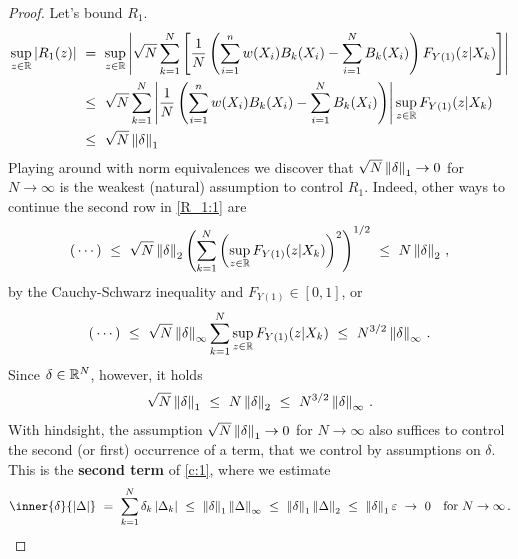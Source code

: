\begin{proof}
  Let's bound $R_1$.
  \begin{align}
    \label{R_1:1}
    \begin{split}
    \sup_{z\in\R}
    \left| 
    R_1(z)
    \right|
    &
    \ 
    =
    \ 
    \sup_{z\in\R}
    \left| 
  \sqrt{N}
  \sum_{k=1}^{N} 
  \left[ 
  \frac{1}{N}
  \left( 
    \sum_{i=1}^{n} 
    w(X_i)
    B_k(X_i)
    -
    \sum_{i=1}^{N} 
    B_k(X_i)
  \right)
  F_{Y(1)}(z|X_k)
  \right]
    \right|
    \\
    &
    \ 
    \le
    \ 
  \sqrt{N}
  \sum_{k=1}^{N} 
  \left| 
  \frac{1}{N}
  \left( 
    \sum_{i=1}^{n} 
    w(X_i)
    B_k(X_i)
    -
    \sum_{i=1}^{N} 
    B_k(X_i)
  \right)
  \right|
    \sup_{z\in\R}
  F_{Y(1)}(z|X_k)
  \\
    &
    \ 
    \le
    \ 
  \sqrt{N}
  \norm{\delta}_1
    \end{split}
  \end{align}
  Playing around with norm equivalences we discover that 
  $\sqrt{N}\left\lVert\delta\right\rVert_1\to 0$ for $N\to \infty$ is the weakest
  (natural) assumption to
  control $R_1$.
  Indeed, other ways to continue the second row in \eqref{R_1:1} are
  \begin{gather*}
    (\,\cdots)
    \ 
  \le
    \ 
  \sqrt{N}
  \norm{\delta}_2
  \left( 
  \sum_{k=1}^{N} 
  \left( 
    \sup_{z\in\R}
  F_{Y(1)}(z|X_k)
  \right)^2
\right)^{1/2}
\ 
\le
\ 
N
  \norm{\delta}_2\,,
  \end{gather*}
  by the Cauchy-Schwarz inequality and
  $
  F_{Y(1)}\in [0,1]
  $,
or
\begin{gather*}
  (\,\cdots)
  \ 
  \le
  \ 
  \sqrt{N}
  \norm{\delta}_\infty
  \sum_{k=1}^{N} 
    \sup_{z\in\R}
  F_{Y(1)}(z|X_k)
  \ 
  \le
  \ 
  N^{3/2}
  \norm{\delta}_\infty
  \,.
\end{gather*}
Since $\delta\in \mathbb{R}^N$, however, it holds
\begin{gather*}
  \sqrt{N}\norm{\delta}_1
  \ 
  \le
  \ 
  N\norm{\delta}_2
  \ 
  \le
  \ 
  N^{3/2}\norm{\delta}_\infty
  \,.
\end{gather*}
With hindsight, the assumption 
  $\sqrt{N}\left\lVert\delta\right\rVert_1\to 0$ for $N\to \infty$ 
  also 
  suffices 
  to control the second (or first) occurrence of a term, that we control by assumptions on $\delta$.
This is the \textbf{second term} of \eqref{c:1}, where we estimate
\begin{gather*}
  \inner{\delta}{\left| \Delta \right|}
  \ 
  =
  \ 
  \sum_{k=1}^{N} 
  \delta_k
  \left| \Delta_k \right|
  \ 
  \le
  \ 
  \norm{\delta}_1
  \norm{\Delta}_\infty
  \ 
  \le
  \ 
  \norm{\delta}_1
  \norm{\Delta}_2
  \ 
  \le
  \ 
  \norm{\delta}_1
  \varepsilon
  \ 
  \to
  \ 
  0
  \quad
  \text{for}\ 
  N\to \infty
  \,.
\end{gather*}

\end{proof}
